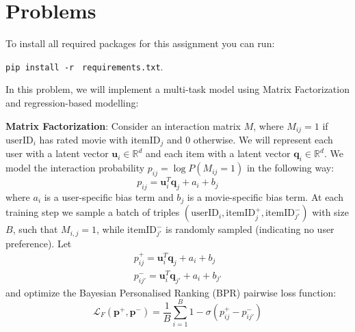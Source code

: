 \documentclass[12pt]{article}
\begin{document}




    \section{Problems}

    To install all required packages for this assignment you can run:

    \texttt{pip install -r} \texttt{ requirements.txt}.




    \noindent In this problem, we will implement a multi-task model using Matrix Factorization \cite{Yehuda2009matrix} and regression-based modelling:

    \vspace{0.2cm}

    \noindent\textbf{Matrix Factorization}: Consider an interaction matrix $M$, where $M_{ij} = 1$ if $\text{userID}_i$ has rated movie with $\text{itemID}_j$ and $0$ otherwise. We will represent each user with a latent vector $\mathbf{u}_i\in\mathbb{R}^d$ and each item with a latent vector $\mathbf{q}_i\in\mathbb{R}^d$. We model the interaction probability $p_{ij}=\log P(M_{ij}=1)$ in the following way:
    \begin{equation}
        p_{ij} = \mathbf{u}_i^T\mathbf{q}_j + a_i + b_j
        \label{eq:prob}
    \end{equation}
    where $a_i$ is a user-specific bias term and $b_j$ is a movie-specific bias term. At each training step we sample a batch of triples $(\text{userID}_i, \text{itemID}_j^+, \text{itemID}_{j'}^-)$ with size $B$, such that $M_{i, j} = 1$, while $\text{itemID}_{j'}^-$ is randomly sampled (indicating no user preference). Let
    \begin{equation}
        \begin{split}
            p^+_{ij} =  \mathbf{u}_i^T\mathbf{q}_j + a_i + b_j \\
            p^-_{ij'} =  \mathbf{u}_i^T\mathbf{q}_{j'} + a_i + b_{j'}
        \end{split}
        \label{eq:p}
    \end{equation}
    and optimize the Bayesian Personalised Ranking (BPR) \cite{Rendle2009BPR} pairwise loss function:
    \begin{equation}
        \mathcal{L}_F(\mathbf{p}^+, \mathbf{p}^-)=\frac{1}{B}\sum_{i=1}^B 1-\sigma(p_{ij}^+-p_{ij'}^-)
        \label{eq:l1}
    \end{equation}
\end{document}
